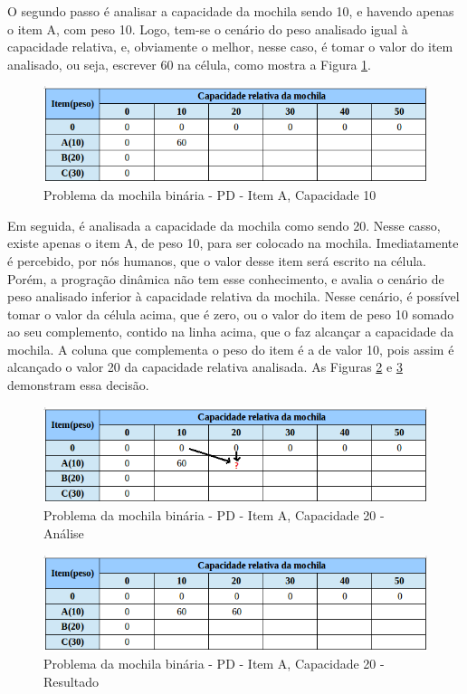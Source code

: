 \begin{itemize}
O segundo passo é analisar a capacidade da mochila sendo 10, e havendo apenas o item A, com peso 10. Logo, tem-se o cenário do peso analisado igual à capacidade relativa, e, obviamente o melhor, nesse caso, é tomar o valor do item analisado, ou seja, escrever 60 na célula, como mostra a Figura \ref{matriz60}.

\FloatBarrier
\begin{figure}[!h]
\centering
\includegraphics[keepaspectratio=true,scale=0.5]{figuras/matriz60.png}
\caption{Problema da mochila binária - PD - Item A, Capacidade 10}
\label{matriz60}
\end{figure}

Em seguida, é analisada a capacidade da mochila como sendo 20. Nesse casso, existe apenas o item A, de peso 10, para ser colocado na mochila. Imediatamente é percebido, por nós humanos, que o valor desse item será escrito na célula. Porém, a progração dinâmica não tem esse conhecimento, e avalia o cenário de peso analisado inferior à capacidade relativa da mochila. Nesse cenário, é possível tomar o valor da célula acima, que é zero, ou o valor do item de peso 10 somado ao seu complemento, contido na linha acima, que o faz alcançar a capacidade da mochila. A coluna que complementa o peso do item é a de valor 10, pois assim é alcançado o valor 20 da capacidade relativa analisada. As Figuras \ref{matriz10_20} e \ref{matriz10_20_resp} demonstram essa decisão.

\FloatBarrier
\begin{figure}[!h]
\centering
\includegraphics[keepaspectratio=true,scale=0.6]{figuras/matriz10_20.png}
\caption{Problema da mochila binária - PD - Item A, Capacidade 20 - Análise }
\label{matriz10_20}
\end{figure}

\FloatBarrier
\begin{figure}[!h]
\centering
\includegraphics[keepaspectratio=true,scale=0.6]{figuras/matriz10_20_resp.png}
\caption{Problema da mochila binária - PD - Item A, Capacidade 20 - Resultado}
\label{matriz10_20_resp}
\end{figure}


\end{itemize}
